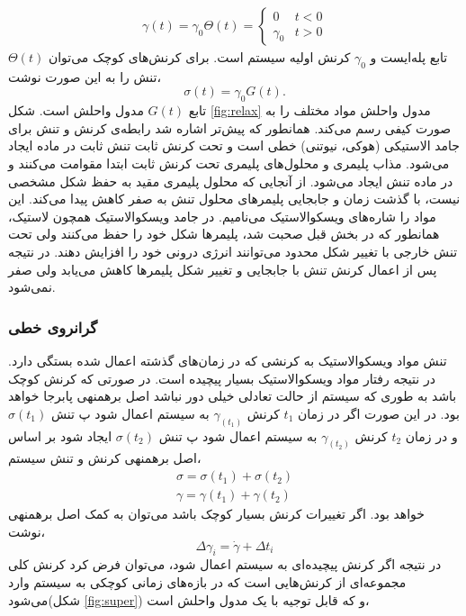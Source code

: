 \begin{equation}
\begin{aligned}
\gamma(t)=\gamma_0\Theta(t)=
  \begin{cases}
    0       & t<0\\
    \gamma_0  & t>0
  \end{cases}
\end{aligned}\label{eq:step_stress}
\end{equation}
$\Theta(t)$ تابع پله‌ایست و $\gamma_0$ کرنش اولیه سیستم است. برای کرنش‌های کوچک می‌توان تنش را به این صورت نوشت،
\begin{equation}
\sigma(t)=\gamma_0G(t).
\end{equation}
تابع $G(t)$ مدول واحلش است. شکل \ref{fig:relax} مدول واحلش مواد مختلف را به صورت کیفی رسم می‌کند. همانطور که پیش‌تر اشاره شد رابطه‌ی کرنش و تنش برای جامد الاستیکی (هوکی، نیوتنی) خطی است و تحت کرنش ثابت تنش ثابت در ماده ایجاد می‌شود. مذاب پلیمری و محلول‌های پلیمری تحت کرنش ثابت ابتدا مقوامت می‌کنند و در ماده تنش ایجاد می‌شود. از آنجایی که محلول پلیمری مقید به حفظ شکل مشخصی نیست، با گذشت زمان و جابجایی پلیمر‌های محلول تنش به صفر کاهش پیدا می‌کند. این مواد را شاره‌های ویسکوالاستیک می‌نامیم. در جامد ویسکوالاستیک همچون لاستیک، همانطور که در بخش قبل صحبت شد، پلیمرها شکل‌ خود را حفظ می‌کنند ولی تحت تنش خارجی با تغییر شکل محدود می‌توانند انرژی درونی خود را افزایش دهند. در نتیجه پس از اعمال کرنش تنش با جابجایی و تغییر شکل پلیمر‌ها کاهش می‌یابد ولی صفر نمی‌شود.
\subsubsection{گرانروی خطی}

تنش مواد ویسکوالاستیک به کرنشی که در زمان‌های گذشته اعمال شده بستگی دارد. در نتیجه رفتار مواد ویسکوالاستیک بسیار پیچیده است. در صورتی که کرنش کوچک باشد به طوری که سیستم از حالت تعادلی خیلی دور نباشد اصل برهمنهی پابرجا خواهد بود\cite{doi}. در این صورت اگر در زمان $t_1$ کرنش $\gamma_(t_1)$ به سیستم اعمال شود پ تنش $\sigma(t_1)$ و در  زمان $t_2$ کرنش $\gamma_(t_2)$ به سیستم اعمال شود پ تنش $\sigma(t_2)$ ایجاد شود بر اساس اصل برهمنهی کرنش و تنش سیستم،
\begin{equation}
\begin{aligned}
\sigma=\sigma(t_1)+\sigma(t_2) \\
\gamma=\gamma(t_1)+\gamma(t_2)
\end{aligned}
\end{equation}
خواهد بود. اگر تغییرات کرنش بسیار کوچک باشد می‌توان به کمک اصل برهمنهی نوشت،
\begin{equation}
\Delta\gamma_i=\dot\gamma+\Delta t_i
\end{equation}
در نتیجه اگر کرنش پیچیده‌ای به سیستم اعمال شود، می‌توان فرض کرد کرنش کلی مجموعه‌ای از کرنش‌هایی است که در بازه‌های زمانی کوچکی به سیستم وارد می‌شود(شکل \ref{fig:super}) و که قابل توجیه با یک مدول واحلش است، 

